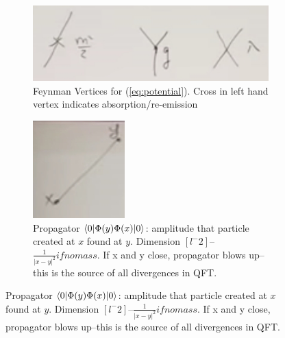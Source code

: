 \documentclass[]{article}
\begin{document}
\begin{figure}[H]
	\begin{center}
		\caption{Elements of a Feynman diagram}
		\begin{subfigure}[t]{0.45\textwidth}
			\caption{Feynman Vertices for (\ref{eq:potential}). Cross in left hand vertex indicates absorption/re-emission}\label{fig:3-1-feynman-vertices}
			\includegraphics[width=\textwidth]{3-1-feynman-vertices}
		\end{subfigure}
			\begin{subfigure}[t]{0.45\textwidth}
			\caption{Propagator $\braket{0|\Phi(y)\Phi(x)|0}$: amplitude that particle created at $x$ found at $y$. Dimension $[l^-2]$--$\frac{1}{|x-y|^2} if no mass$. If x and y close, propagator blows up--this is the source of all divergences in QFT.}\label{fig:3-1-feynman-propagator}
		\includegraphics[width=\textwidth]{3-1-feynman-propagator}
	\end{subfigure}
	\end{center}
\end{figure}
\end{document}

